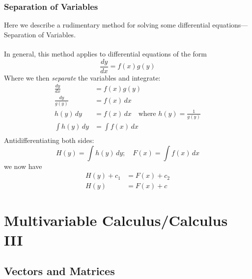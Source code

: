 \documentclass{report}
\begin{document}
\subsection{Separation of Variables} %
Here we describe a rudimentary method for solving some differential equations---\\Separation of Variables.\\
\vspace{1mm}\\
In general, this method applies to differential equations of the form
\begin{equation*}
\frac{dy}{dx}=f(x)g(y)
\end{equation*}
Where we then \textit{separate} the variables and integrate:
\begin{align*}
\frac{dy}{dx}&=f(x)g(y)\\
\frac{dy}{g(y)}&=f(x)\,dx\\
h(y)\,dy&=f(x)\,dx\quad\text{where }h(y)=\frac{1}{g(y)}\\
\int h(y)\,dy&=\int f(x)\,dx\\
\end{align*}
Antidifferentiating both sides:
\begin{equation*}
H(y)=\int h(y)\,dy;\quad F(x)=\int f(x)\,dx
\end{equation*}
we now have
\begin{align*}
H(y)+c_1&=F(x)+c_2\\
H(y)&=F(x)+c
\end{align*}


\chapter{Multivariable Calculus/Calculus III}

\section{Vectors and Matrices} %
\end{document}
